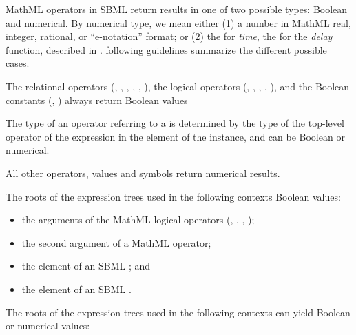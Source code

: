MathML operators in SBML return results in one of two
possible types: Boolean and numerical.  By numerical type,
we mean either (1) a number in MathML real, integer, rational, or
``e-notation'' format; or (2) the  for \emph{time},
the  for the \emph{delay} function,  described in
.
 following guidelines
summarize the different possible cases.

The relational operators (, , ,
, , ), the logical operators
(, , , , ), and the
Boolean constants (, ) always return
Boolean values

The type of an operator referring to a \FunctionDefinition is
determined by the type of the top-level operator of the expression
in the  element of the \FunctionDefinition
instance, and can be Boolean or numerical.

All other operators, values and symbols return numerical
results.

The roots of the expression trees used in the following contexts
 Boolean values:

\begin{itemize}\setlength{\parskip}{-0.2ex}

\item the arguments of the MathML logical operators (,
, , );

\item the second argument of a MathML  operator;

\item the  element of an SBML \Event; and

\item the  element of an SBML \Constraint.

\end{itemize}

The roots of the expression trees used in the following contexts can
yield Boolean or numerical values:


